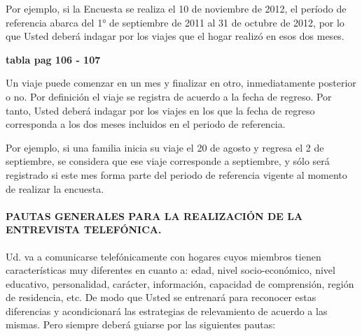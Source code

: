 \documentclass[
  openany]{book}
\begin{document}
Por ejemplo, si la Encuesta se realiza el 10 de noviembre de 2012, el período de referencia abarca del 1° de septiembre de 2011 al 31 de octubre de 2012, por lo que Usted deberá indagar por los viajes que el hogar realizó en esos dos meses.

\textbf{tabla pag 106 - 107}

Un viaje puede comenzar en un mes y finalizar en otro, inmediatamente posterior o no. Por definición el viaje se registra de acuerdo a la fecha de regreso. Por tanto, Usted deberá indagar por los viajes en los que la fecha de regreso corresponda a los dos meses incluidos en el periodo de referencia.

Por ejemplo, si una familia inicia su viaje el 20 de agosto y regresa el 2 de septiembre, se considera que ese viaje corresponde a septiembre, y sólo será registrado si este mes forma parte del periodo de referencia vigente al momento de realizar la encuesta.

\hypertarget{pautas-generales-para-la-realizaciuxf3n-de-la-entrevista-telefuxf3nica.}{%
\paragraph{\texorpdfstring{\textbf{PAUTAS GENERALES PARA LA REALIZACIÓN DE LA ENTREVISTA TELEFÓNICA.}}{PAUTAS GENERALES PARA LA REALIZACIÓN DE LA ENTREVISTA TELEFÓNICA.}}\label{pautas-generales-para-la-realizaciuxf3n-de-la-entrevista-telefuxf3nica.}}

Ud. va a comunicarse telefónicamente con hogares cuyos miembros tienen características muy diferentes en cuanto a: edad, nivel socio-económico, nivel educativo, personalidad, carácter, información, capacidad de comprensión, región de residencia, etc. De modo que Usted se entrenará para reconocer estas diferencias y acondicionará las estrategias de relevamiento de acuerdo a las mismas. Pero siempre deberá guiarse por las siguientes pautas:
\end{document}
